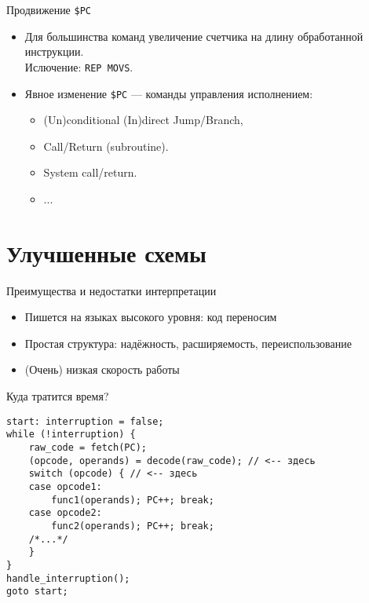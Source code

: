 \begin{frame}{Продвижение \texttt{\$PC}}
\begin{itemize}
    \item Для большинства команд увеличение счетчика на длину обработанной инструкции. \\
    Ислючение: \texttt{REP MOVS}.
    \pause\bigskip
    \item Явное изменение \texttt{\$PC} --- команды управления исполнением:
    \begin{itemize}
        \item (Un)conditional (In)direct Jump/Branch,
        \item Call/Return (subroutine).
        \item System call/return.
        \item ...
    \end{itemize}
\end{itemize}
\end{frame}

\section{Улучшенные схемы}

\begin{frame}{Преимущества и недостатки интерпретации}
\begin{itemize}
\item Пишется на языках высокого уровня: код переносим
\item Простая структура: надёжность, расширяемость, переиспользование
\end{itemize}
\pause
\begin{itemize}
\item (Очень) низкая скорость работы
\end{itemize}
\end{frame}

\begin{frame}[fragile]{Куда тратится время?}
\begin{verbatim}
start: interruption = false;
while (!interruption) {
    raw_code = fetch(PC);
    (opcode, operands) = decode(raw_code); // <-- здесь
    switch (opcode) { // <-- здесь
    case opcode1:
        func1(operands); PC++; break;
    case opcode2:
        func2(operands); PC++; break;
    /*...*/
    }
}
handle_interruption();
goto start;
\end{verbatim}
\end{frame}

